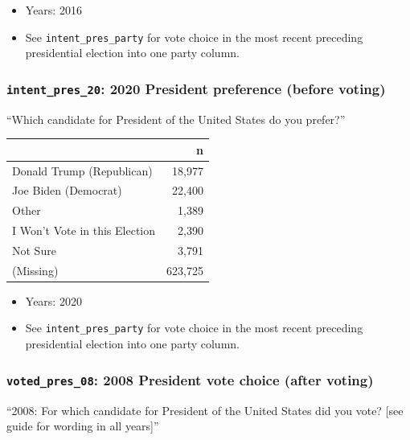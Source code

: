 \documentclass[10pt,article,oneside]{memoir}
\theoremstyle{definition}
\begin{document}
\begin{itemize}
\tightlist
\item
  Years: 2016
\item
  See \texttt{intent\_pres\_party} for vote choice in the most recent
  preceding presidential election into one party column.
\end{itemize}

\subsubsection{\texorpdfstring{\texttt{intent\_pres\_20}: 2020 President
preference (before
voting)}{intent\_pres\_20: 2020 President preference (before voting)}}\label{intent_pres_20-2020-president-preference-before-voting}

``Which candidate for President of the United States do you prefer?''

\begin{table}[H]
\centering
\begin{tabular}[t]{lr}
\toprule
 & n\\
\midrule
Donald Trump (Republican) & 18,977\\
Joe Biden (Democrat) & 22,400\\
Other & 1,389\\
I Won't Vote in this Election & 2,390\\
Not Sure & 3,791\\
(Missing) & 623,725\\
\bottomrule
\end{tabular}
\end{table}

\begin{itemize}
\tightlist
\item
  Years: 2020
\item
  See \texttt{intent\_pres\_party} for vote choice in the most recent
  preceding presidential election into one party column.
\end{itemize}

\subsubsection{\texorpdfstring{\texttt{voted\_pres\_08}: 2008 President
vote choice (after
voting)}{voted\_pres\_08: 2008 President vote choice (after voting)}}\label{voted_pres_08-2008-president-vote-choice-after-voting}

``2008: For which candidate for President of the United States did you
vote? {[}see guide for wording in all years{]}''
\end{document}

